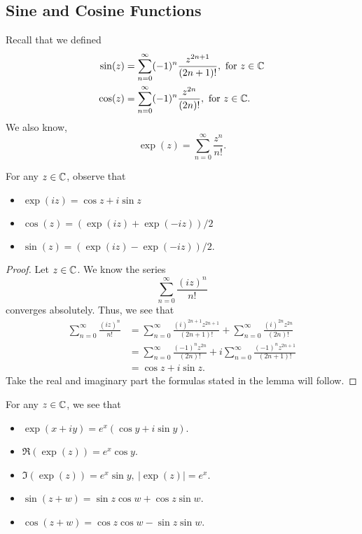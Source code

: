 \documentclass[a4paper]{report}
\begin{document}
\subsection{Sine and Cosine Functions}

Recall that we defined 
\begin{align*}
    \sin(z) &= \sum_{ n=0  }^{ \infty  } (-1)^{n} \frac{ z^{2n+1} }{ (2n+1)! } , \ \text{for} \ z \in \mathbb{C}  \\
    \cos(z) &= \sum_{ n = 0  }^{ \infty  } (-1)^{n} \frac{ z^{2n}  }{ (2n)! } , \ \text{for} \ z \in \mathbb{C}. 
\end{align*}
We also know,
\[  \exp(z) = \sum_{ n=0 }^{ \infty  } \frac{ z^{n} }{ n! }.  \]

\begin{lemma}
    For any \( z \in \mathbb{C}  \), observe that
    \begin{itemize}
        \item \( \exp(iz) = \cos z + i \sin z  \)
        \item \( \cos(z) = (\exp(iz) + \exp(-iz)) / 2 \) 
        \item \( \sin(z) = (\exp(iz) - \exp(-iz)) / 2 \).
    \end{itemize}
\end{lemma}

\begin{proof}
Let \( z \in \mathbb{C}  \). We know the series
\[  \sum_{ n=0 }^{ \infty  } \frac{ (iz)^{n} }{ n! }  \] converges absolutely.
Thus, we see that
\begin{align*}
    \sum_{ n=0 }^{ \infty  } \frac{ (iz)^{n} }{ n! } &= \sum_{ n=0 }^{ \infty  } \frac{ (i)^{2n+1} z^{2n+1} }{ (2n+1)! }  + \sum_{ n=0 }^{ \infty  } \frac{ (i)^{2n} z^{2n} }{ (2n)! }  \\
                                                     &= \sum_{ n=0 }^{ \infty  } \frac{ (-1)^{n} z^{2n} }{ (2n)! }  +  i  \sum_{ n=0 }^{ \infty  } \frac{ (-1)^{n} z^{2n+1} }{ (2n+1)! } \\
                                                     &= \cos z + i \sin z.
\end{align*}
Take the real and imaginary part the formulas stated in the lemma will follow.
\end{proof}

\begin{corollary}
    For any \( z \in \mathbb{C}  \), we see that 
    \begin{itemize}
        \item \( \exp(x + iy) = e^{x} (\cos y + i \sin y) \).  
        \item \( \Re(\exp(z)) = e^{x} \cos y \).
        \item \( \Im(\exp(z)) = e^{x} \sin y, \ | \exp(z) |  = e^{x} \).
        \item \( \sin(z +w) = \sin z \cos w + \cos z \sin w \).
        \item  \( \cos(z + w) = \cos z \cos w - \sin z \sin w  \).
    \end{itemize}
\end{corollary}
\end{document}
